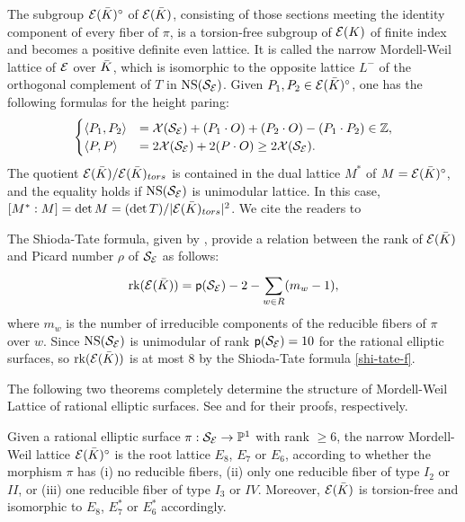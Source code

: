 \documentclass[11pt]{amsart}
\begin{document}
The subgroup ${\mathcal E}({{\bar K}})^\circ$ of ${\mathcal E}({{\bar K}})$, consisting of those sections meeting the identity component of every fiber of $\pi$, 
is a torsion-free subgroup of ${\mathcal E}(K) $ of finite index and becomes a positive definite even lattice. 
It is called the {\sf narrow Mordell-Weil lattice} of ${\mathcal E}$ over ${{\bar K}}$, which is   isomorphic  to the opposite lattice $L^-$ of the orthogonal complement  of $T$ in ${\rm NS} ({\mathcal S}_{\mathcal E})$. Given  $P_1, P_2 \in {\mathcal E}({{\bar K}})^\circ$, one has the following formulas for the height paring:
\begin{equation}
	\label{hf2}
	\begin{cases}
		\left\langle P_1, P_2\right\rangle & ={\mathcal X} ({\mathcal S}_{\mathcal E})+ (P_1 \cdot O)+(P_2 \cdot O)- (P_1 \cdot P_2)\in {\mathbb Z},\\
		\left\langle P, P\right\rangle &=2 {\mathcal X} ({\mathcal S}_{\mathcal E})+ 2 (P\cdot  O) \geq 2 {\mathcal X} ({\mathcal S}_{\mathcal E}). 
	\end{cases}
\end{equation}
The quotient ${\mathcal E}({{\bar K}})/ {\mathcal E}({{\bar K}})_{tors}$ is contained in the dual lattice $M^*$ of $M={\mathcal E}({{\bar K}})^\circ$, and the equality holds 
if ${\rm NS} ({\mathcal S}_{\mathcal E})$ is unimodular lattice. In this case, 
$[M^*:M]=\det M=(\det T)/ | {\mathcal E}({{\bar K}})_{tors}|^2$. We cite the readers to  \cite[Theorem 9.1]{Shioda1992a}




The  {\sf Shioda-Tate} formula, given by  \cite[Crollary 5.3]{Shioda1990a}, provide a relation between the rank of ${\mathcal E}({{\bar K}})$ and Picard number   $\rho$  of ${\mathcal S}_{\mathcal E}$
as follows:
\begin{equation}
	\label{shi-tate-f}
	{\text{rk}}({\mathcal E}({{\bar K}}))={\sf p}({\mathcal S}_{\mathcal E}) -2 - \sum_{w\in R}^{}(m_{w}-1),
\end{equation}
where $m_{w}$ is the number of irreducible components of the reducible  fibers of  $\pi$ over $w$.
Since ${\rm NS} ({\mathcal S}_{\mathcal E})$ is unimodular of rank  ${\sf p}({\mathcal S}_{\mathcal E}) = 10$ for the  rational elliptic surfaces,
so  ${\text{rk}}({\mathcal E}({{\bar K}}))$ is at most $8$ by the Shioda-Tate formula \eqref{shi-tate-f}.

The following two theorems completely determine the structure of Mordell-Weil Lattice of rational elliptic surfaces.
See \cite[Theorem 10.4]{Shioda1992a} and \cite[Theorem 10.10]{Shioda1992a} for their proofs, respectively.
\begin{thm}
	\label{shi1}
	Given 	a rational elliptic surface 	$\pi: {\mathcal S}_{\mathcal E} \rightarrow {\mathbb P}^1 $  with rank  $\geq 6$, 
	the narrow Mordell-Weil lattice ${\mathcal E}({{\bar K}})^\circ$ is the root lattice $E_8$, $E_7$ or $E_6$, according to whether 
	the morphism	$\pi $ has (i) no reducible fibers, (ii) only one reducible fiber of type $I_2$ or $II$,
	or (iii) one reducible fiber of type $I_3$ or $IV$. Moreover, ${\mathcal E}({{\bar K}})$ is torsion-free and isomorphic to  $E_8$, $E_7^*$ or $E_6^*$ accordingly.
\end{thm}
\end{document}
